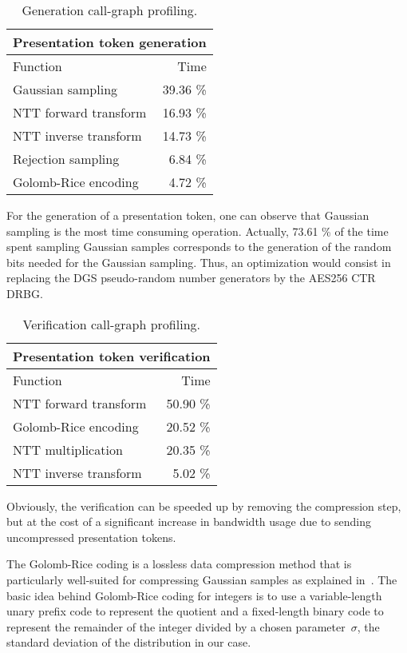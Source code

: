 \begin{table}[!ht]
\centering
\caption{Generation call-graph profiling.}
\label{tab:gprof}
\begin{tabular}{lr}
\toprule
\multicolumn{2}{c}{\textbf{Presentation token generation}} \\
\midrule
 Function & Time \\
\midrule
Gaussian sampling  & 39.36 \% \\
NTT forward transform & 16.93 \% \\
NTT inverse transform & 14.73 \% \\
Rejection sampling & 6.84 \% \\
Golomb-Rice encoding & 4.72 \% \\
\bottomrule
\end{tabular}
\end{table}

For the generation of a presentation token, one can observe that Gaussian sampling is the most time consuming operation. Actually, 73.61 \% of the time spent sampling Gaussian samples corresponds to the generation of the random bits needed for the Gaussian sampling. Thus, an optimization would consist in replacing the DGS pseudo-random number generators by the AES256 CTR DRBG.

\begin{table}[!ht]
\centering
\caption{Verification call-graph profiling.}
\label{tab:vprof}
\begin{tabular}{lr}
\toprule
\multicolumn{2}{c}{\textbf{Presentation token verification}} \\
\midrule
 Function & Time \\
\midrule
NTT forward transform & 50.90 \% \\
Golomb-Rice encoding & 20.52 \% \\
NTT multiplication & 20.35 \% \\
NTT inverse transform & 5.02 \% \\
\bottomrule
\end{tabular}
\end{table}

Obviously, the verification can be speeded up by removing the compression step, but at the cost of a significant increase in bandwidth usage due to sending uncompressed presentation tokens.

The Golomb-Rice coding is a lossless data compression method that is particularly well-suited for compressing Gaussian samples as explained in~\cite{C:ETWY22}. The basic idea behind Golomb-Rice coding for integers is to use a variable-length unary prefix code to represent the quotient and a fixed-length binary code to represent the remainder of the integer divided by a chosen parameter~$\sigma$, the standard deviation of the distribution in our case.

